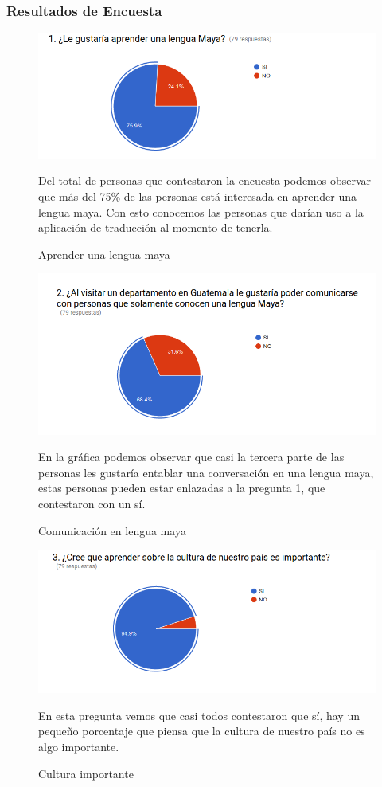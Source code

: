 \documentclass[a4paper,openright,11pt]{article}
\begin{document}
\subsubsection{Resultados de Encuesta}
\begin{figure}[H]
	\includegraphics[width=1.0\textwidth]{e1}
	\caption{Aprender una lengua maya}
	\label{fig:e1}
	Del total de personas que contestaron la encuesta podemos observar que más del 75\% de las personas está interesada en aprender una lengua maya. Con esto conocemos las personas que darían uso a la aplicación de traducción al momento de tenerla.
\end{figure}
\begin{figure}[H]
	\includegraphics[width=1.0\textwidth]{e2}
	\caption{Comunicación en lengua maya}
	\label{fig:e2}
	En la gráfica podemos observar que casi la tercera parte de las personas les gustaría entablar una conversación en una lengua maya, estas personas pueden estar enlazadas a la pregunta 1, que contestaron con un sí.
\end{figure}
\begin{figure}
	\includegraphics[width=1.0\textwidth]{e3}
	\caption{Cultura importante}
	\label{fig:e3}
	En esta pregunta vemos que casi todos contestaron que sí, hay un pequeño porcentaje que piensa que la cultura de nuestro país no es algo importante.
\end{figure}
\end{document}
